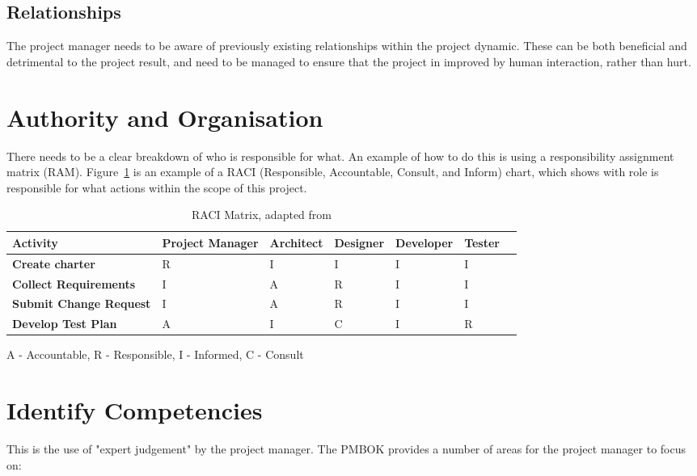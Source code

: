 \subsection{Relationships}

The project manager needs to be aware of previously existing relationships within the project dynamic. These can be both beneficial and detrimental to the project result, and need to be managed to ensure that the project in improved by human interaction, rather than hurt. 

\section{Authority and Organisation}

There needs to be a clear breakdown of who is responsible for what. An example of how to do this is using a responsibility assignment matrix (RAM). Figure~\ref{fig:ram} is an example of a RACI (Responsible, Accountable, Consult, and Inform) chart, which shows with role is responsible for what actions within the scope of this project.

\begin{table}[H]
\caption{RACI Matrix, adapted from \parencite{pmbok}}
\begin{center}
    \begin{tabular}{ | l | l | l | l | l | l | p{5cm} |}
    \hline
	\textbf{Activity} & \textbf{Project Manager} & \textbf{Architect} & \textbf{Designer} & \textbf{Developer} & \textbf{Tester}\\ \hline
	\textbf{Create charter} & R & I & I & I & I \\ \hline
	\textbf{Collect Requirements} & I & A & R & I & I \\ \hline
	\textbf{Submit Change Request} & I & A & R & I & I \\ \hline
	\textbf{Develop Test Plan} & A & I & C & I & R \\ \hline
    \end{tabular}
	A - Accountable, R - Responsible, I - Informed, C - Consult

\end{center}
\label{fig:ram}
\end{table}

\section{Identify Competencies}

This is the use of "expert judgement" \parencite{pmbok} by the project manager. The PMBOK provides a number of areas for the project manager to focus on:

